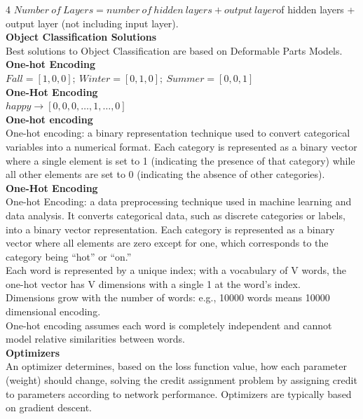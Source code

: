 \documentclass[8pt]{extarticle}
\begin{document}
\begin{multicols}{4}
{$Number\ of\ Layers = number\ of\ hidden\ layers + output\ layer$\Number of hidden layers + output layer (not including input layer).\\
\vspace{2pt}\textbf{Object Classification Solutions}\\
Best solutions to Object Classification are based on Deformable Parts Models.\\
\vspace{2pt}\textbf{One-hot Encoding}\\
$Fall = [1, 0, 0];\ Winter = [0, 1, 0];\ Summer = [0, 0, 1]$\\
\vspace{2pt}\textbf{One-Hot Encoding}\\
$happy \rightarrow [0, 0, 0, \ldots{}, 1, \ldots{}, 0]$\\
\vspace{2pt}\textbf{One-hot encoding}\\
One-hot encoding: a binary representation technique used to convert categorical variables into a numerical format. Each category is represented as a binary vector where a single element is set to 1 (indicating the presence of that category) while all other elements are set to 0 (indicating the absence of other categories).\\
\vspace{2pt}\textbf{One-Hot Encoding}\\
One-hot Encoding: a data preprocessing technique used in machine learning and data analysis. It converts categorical data, such as discrete categories or labels, into a binary vector representation. Each category is represented as a binary vector where all elements are zero except for one, which corresponds to the category being ``hot'' or ``on.''\\
Each word is represented by a unique index; with a vocabulary of V words, the one-hot vector has V dimensions with a single 1 at the word's index.\\
Dimensions grow with the number of words: e.g., 10000 words means 10000 dimensional encoding.\\
One-hot encoding assumes each word is completely independent and cannot model relative similarities between words.\\
\vspace{2pt}\textbf{Optimizers}\\
An optimizer determines, based on the loss function value, how each parameter (weight) should change, solving the credit assignment problem by assigning credit to parameters according to network performance. Optimizers are typically based on gradient descent.\\
}
\end{multicols}
\end{document}
